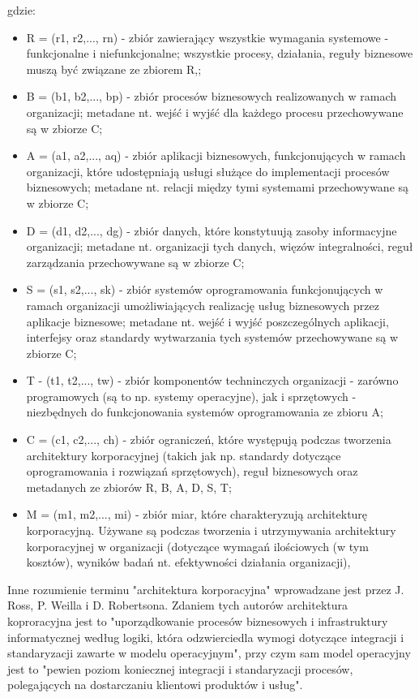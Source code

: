 gdzie:
\begin{itemize}
\item{R = (r1, r2,..., rn) - zbiór zawierający wszystkie wymagania systemowe - funkcjonalne i niefunkcjonalne; wszystkie procesy, działania, reguły biznesowe muszą być związane ze zbiorem R,;}
\item{B = (b1, b2,..., bp) - zbiór procesów biznesowych realizowanych w ramach organizacji; metadane nt. wejść i wyjść dla każdego procesu przechowywane są w zbiorze C;}
\item{A = (a1, a2,..., aq) - zbiór aplikacji biznesowych, funkcjonujących w ramach organizacji, które udostępniają usługi służące do implementacji procesów biznesowych; metadane nt. relacji między tymi systemami przechowywane są w zbiorze C;}
\item{D = (d1, d2,..., dg) - zbiór danych, które konstytuują zasoby informacyjne organizacji; metadane nt. organizacji tych danych, więzów integralności, reguł zarządzania przechowywane są w zbiorze C;}
\item{S = (s1, s2,..., sk) - zbiór systemów oprogramowania funkcjonujących w ramach organizacji umożliwiających realizację usług biznesowych przez aplikacje biznesowe; metadane nt. wejść i wyjść poszczególnych aplikacji, interfejsy oraz standardy wytwarzania tych systemów przechowywane są w zbiorze C;}
\item{T - (t1, t2,..., tw) - zbiór komponentów techninczych organizacji - zarówno programowych (są to np. systemy operacyjne), jak i sprzętowych - niezbędnych do funkcjonowania systemów oprogramowania ze zbioru A;}
\item{C = (c1, c2,..., ch) - zbiór ograniczeń, które występują podczas tworzenia architektury korporacyjnej (takich jak np. standardy dotyczące oprogramowania i rozwiązań sprzętowych), reguł biznesowych oraz metadanych ze zbiorów R, B, A, D, S, T;}
\item{M = (m1, m2,..., mi) - zbiór miar, które charakteryzują architekturę korporacyjną. Używane są podczas tworzenia i utrzymywania architektury korporacyjnej w organizacji (dotyczące wymagań ilościowych (w tym kosztów), wyników badań nt. efektywności działania organizacji),}
\end{itemize}

Inne rozumienie terminu "architektura korporacyjna" wprowadzane jest przez J. Ross, P. Weilla i D. Robertsona. Zdaniem tych autorów architektura koproracyjna jest to "uporządkowanie procesów biznesowych i infrastruktury informatycznej według logiki, która odzwierciedla wymogi dotyczące integracji i standaryzacji zawarte w modelu operacyjnym", przy czym sam model operacyjny jest to "pewien poziom koniecznej integracji i standaryzacji procesów, polegających na dostarczaniu klientowi produktów i usług".

